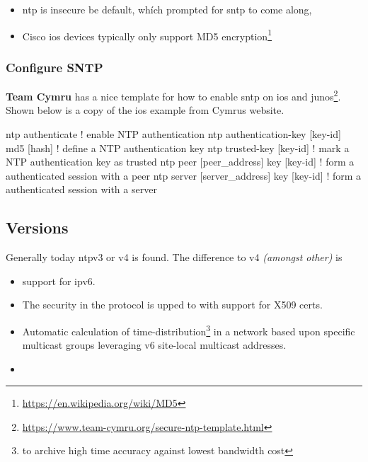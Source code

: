 \begin{itemize}
	\item \gls{ntp} is insecure be default, whích prompted for \gls{sntp} to come along,
	\item Cisco \gls{ios} devices typically only support MD5 encryption\footnote{\url{https://en.wikipedia.org/wiki/MD5}}
\end{itemize}

\subsubsection{Configure SNTP}

\textbf{Team Cymru} has a nice template for how to enable \gls{sntp} on \gls{ios} and \gls{junos}\footnote{\url{https://www.team-cymru.org/secure-ntp-template.html}}. Shown below is a copy of the \gls{ios} example from Cymrus website.

\begin{cisco}
ntp authenticate                            ! enable NTP authentication
ntp authentication-key [key-id] md5 [hash]  ! define a NTP authentication key
ntp trusted-key [key-id]                    ! mark a NTP authentication key as trusted
ntp peer [peer_address] key [key-id]        ! form a authenticated session with a peer
ntp server [server_address] key [key-id]    ! form a authenticated session with a server
\end{cisco}

\subsection{Versions}

Generally today \gls{ntp}v3 or v4 is found. The difference to v4 \textit{(amongst other)} is
\begin{itemize}
	\item support for \gls{ipv6}.
	\item The security in the protocol is upped to with support for X509 certs.
	\item Automatic calculation of time-distribution\footnote{to archive high time accuracy against lowest bandwidth cost} in  a network based upon specific multicast groups leveraging v6 site-local multicast addresses.
	\item {}
\end{itemize}
